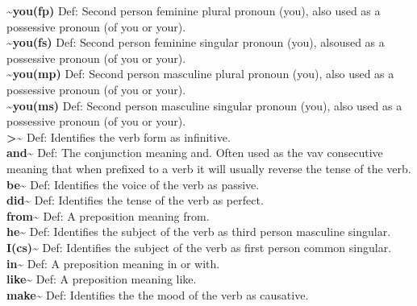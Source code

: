 {\textbf{\textasciitilde{}you(fp)} Def: Second person feminine plural pronoun (you), also used as a possessive pronoun (of you or your).\hfill{}\\

\textbf{\textasciitilde{}you(fs)} Def: Second person feminine singular pronoun (you), alsoused as a possessive pronoun (of you or your).\hfill{}\\

\textbf{\textasciitilde{}you(mp)} Def: Second person masculine plural pronoun (you), also used as a possessive pronoun (of you or your).\hfill{}\\

\textbf{\textasciitilde{}you(ms)} Def: Second person masculine singular pronoun (you), also used as a possessive pronoun (of you or your).\hfill{}\\

\textbf{>\textasciitilde{}} Def: Identifies the verb form as infinitive.\hfill{}\\

\textbf{and\textasciitilde{}} Def: The conjunction meaning and. Often used as the vav consecutive meaning that when prefixed to a verb it will usually reverse the tense of the verb.\hfill{}\\

\textbf{be\textasciitilde{}} Def: Identifies the voice of the verb as passive.\hfill{}\\

\textbf{did\textasciitilde{}} Def: Identifies the tense of the verb as perfect.\hfill{}\\

\textbf{from\textasciitilde{}} Def: A preposition meaning from.\hfill{}\\

\textbf{he\textasciitilde{}} Def: Identifies the subject of the verb as third person masculine singular.\hfill{}\\

\textbf{I(cs)\textasciitilde{}} Def: Identifies the subject of the verb as first person common singular.\hfill{}\\

\textbf{in\textasciitilde{}} Def: A preposition meaning in or with.\hfill{}\\

\textbf{like\textasciitilde{}} Def: A preposition meaning like.\hfill{}\\

\textbf{make\textasciitilde{}} Def: Identifies the the mood of the verb as causative.\hfill{}\\

}
